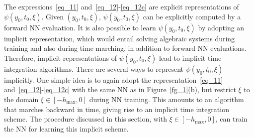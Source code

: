 \begin{remark}\label{rem_24}
  The expressions~\eqref{eq_11} and~\eqref{eq_12}-\eqref{eq_12c} are explicit
  representations of $\psi(y_0,t_0,\xi)$.
  Given $(y_0,t_0,\xi)$, $\psi(y_0,t_0,\xi)$ can be explicitly computed
  by a forward NN evaluation.
  It is also possible to
  learn $\psi(y_0,t_0,\xi)$ by adopting an
  implicit representation, which would entail solving
  algebraic systems  during training and also during time marching,
  in addition to forward NN evaluations.
  Therefore, implicit representations of $\psi(y_0,t_0,\xi)$
  lead to implicit time integration algorithms.
  There are several ways to represent $\psi(y_0,t_0,\xi)$ implicitly.
  One simple idea is to again adopt the
  representation~\eqref{eq_11} and~\eqref{eq_12}-\eqref{eq_12c}
  with the same NN as in Figure~\ref{fg_1}(b),
  but restrict $\xi$ to the domain $\xi\in[-h_{\max},0]$ during NN training.
  This amounts to an algorithm
  that marches backward in time, giving rise to an implicit time
  integration scheme. The procedure
  discussed in this section, with $\xi\in[-h_{\max},0]$,
  can train the NN for learning this implicit scheme.


\end{remark}
